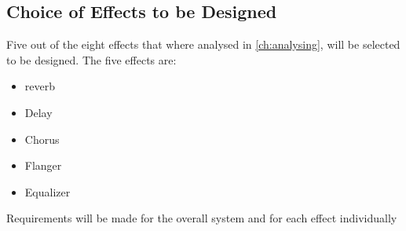\subsection{Choice of Effects to be Designed}
Five out of the eight effects that where analysed in \autoref{ch:analysing}, will be selected to be designed. The five effects are:
\begin{itemize}
	\item \gls{reverb}
	\item Delay
	\item Chorus
	\item Flanger
	\item Equalizer
\end{itemize}

Requirements will be made for the overall system and for each effect individually 
 
 